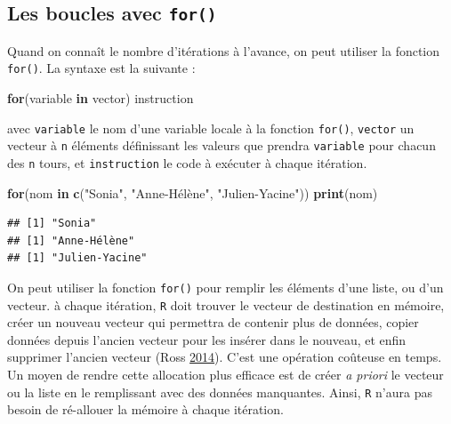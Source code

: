 \documentclass[
  11pt,
]{book}
\newenvironment{Shaded}{\begin{snugshade}}{\end{snugshade}}
\newcommand{\ControlFlowTok}[1]{\textcolor[rgb]{0.13,0.29,0.53}{\textbf{#1}}}
\newcommand{\KeywordTok}[1]{\textcolor[rgb]{0.13,0.29,0.53}{\textbf{#1}}}
\newcommand{\NormalTok}[1]{#1}
\newcommand{\StringTok}[1]{\textcolor[rgb]{0.31,0.60,0.02}{#1}}
\numberwithin{equation}{section}
\numberwithin{countremarque}{section}
\begin{document}
\hypertarget{boucles_boucles_for}{%
\subsection{\texorpdfstring{Les boucles avec \texttt{for()}}{Les boucles avec for()}}\label{boucles_boucles_for}}

Quand on connaît le nombre d'itérations à l'avance, on peut utiliser la fonction \texttt{for()}. La syntaxe est la suivante :

\begin{Shaded}
\begin{Highlighting}[]
\ControlFlowTok{for}\NormalTok{(variable }\ControlFlowTok{in}\NormalTok{ vector) instruction}
\end{Highlighting}
\end{Shaded}

avec \texttt{variable} le nom d'une variable locale à la fonction \texttt{for()}, \texttt{vector} un vecteur à \texttt{n} éléments définissant les valeurs que prendra \texttt{variable} pour chacun des \texttt{n} tours, et \texttt{instruction} le code à exécuter à chaque itération.

\begin{Shaded}
\begin{Highlighting}[]
\ControlFlowTok{for}\NormalTok{(nom }\ControlFlowTok{in}  \KeywordTok{c}\NormalTok{(}\StringTok{"Sonia"}\NormalTok{, }\StringTok{"Anne{-}Hélène"}\NormalTok{, }\StringTok{"Julien{-}Yacine"}\NormalTok{)) }\KeywordTok{print}\NormalTok{(nom)}
\end{Highlighting}
\end{Shaded}

\begin{lstlisting}
## [1] "Sonia"
## [1] "Anne-Hélène"
## [1] "Julien-Yacine"
\end{lstlisting}

On peut utiliser la fonction \texttt{for()} pour remplir les éléments d'une liste, ou d'un vecteur. à chaque itération, \texttt{R} doit trouver le vecteur de destination en mémoire, créer un nouveau vecteur qui permettra de contenir plus de données, copier données depuis l'ancien vecteur pour les insérer dans le nouveau, et enfin supprimer l'ancien vecteur (Ross \protect\hyperlink{ref-Ross_2014_Vectorization}{2014}). C'est une opération coûteuse en temps. Un moyen de rendre cette allocation plus efficace est de créer \emph{a priori} le vecteur ou la liste en le remplissant avec des données manquantes. Ainsi, \texttt{R} n'aura pas besoin de ré-allouer la mémoire à chaque itération.
\end{document}
